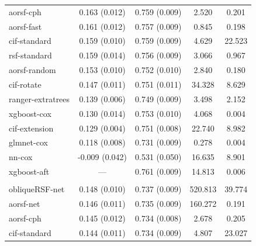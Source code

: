 \documentclass{article}\usepackage[]{graphicx}\usepackage[]{xcolor}
\newenvironment{knitrout}{}{} %
\begin{document}
\begin{knitrout}
\begin{longtable}[t]{lcccc}
\hspace{1em}aorsf-cph & 0.163 (0.012) & 0.759 (0.009) & 2.520 & 0.201\\
\hspace{1em}aorsf-fast & 0.161 (0.012) & 0.757 (0.009) & 0.845 & 0.198\\
\hspace{1em}cif-standard & 0.159 (0.010) & 0.759 (0.009) & 4.629 & 22.523\\
\hspace{1em}rsf-standard & 0.159 (0.014) & 0.756 (0.009) & 3.066 & 0.967\\
\hspace{1em}aorsf-random & 0.153 (0.010) & 0.752 (0.010) & 2.840 & 0.180\\
\hspace{1em}cif-rotate & 0.147 (0.011) & 0.751 (0.011) & 34.328 & 8.629\\
\hspace{1em}ranger-extratrees & 0.139 (0.006) & 0.749 (0.009) & 3.498 & 2.152\\
\hspace{1em}xgboost-cox & 0.130 (0.014) & 0.753 (0.010) & 4.068 & 0.004\\
\hspace{1em}cif-extension & 0.129 (0.004) & 0.751 (0.008) & 22.740 & 8.982\\
\hspace{1em}glmnet-cox & 0.118 (0.008) & 0.731 (0.009) & 0.278 & 0.004\\
\hspace{1em}nn-cox & -0.009 (0.042) & 0.531 (0.050) & 16.635 & 8.901\\
\hspace{1em}xgboost-aft & --- & 0.761 (0.009) & 14.813 & 0.006\\
\addlinespace[0.3em]
\multicolumn{5}{l}{\textit{\textbf{Rotterdam tumor bank; recurrence, n = 2982, p = 11}}}\\
\hline
\hspace{1em}obliqueRSF-net & 0.148 (0.010) & 0.737 (0.009) & 520.813 & 39.774\\
\hspace{1em}aorsf-net & 0.146 (0.011) & 0.735 (0.009) & 160.272 & 0.191\\
\hspace{1em}aorsf-cph & 0.145 (0.012) & 0.734 (0.008) & 2.678 & 0.205\\
\hspace{1em}cif-standard & 0.144 (0.011) & 0.734 (0.009) & 4.807 & 23.027\\

\end{longtable}
\end{knitrout}
\end{document}
